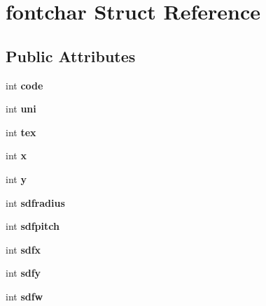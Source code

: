 \hypertarget{structfontchar}{}\section{fontchar Struct Reference}
\label{structfontchar}
\subsection*{Public Attributes}
\begin{DoxyCompactItemize}
\item 
\mbox{\label{structfontchar_a5b75429ff655bda1fae43bba91c30109}} 
int {\bfseries code}
\item 
\mbox{\label{structfontchar_a2c5a26a10fed40d19840cc2be99cb466}} 
int {\bfseries uni}
\item 
\mbox{\label{structfontchar_a61ac569a542afe35acaa01c76b6ed7e6}} 
int {\bfseries tex}
\item 
\mbox{\label{structfontchar_a0a8dcacee2bf0a1b8467f97c65e8b661}} 
int {\bfseries x}
\item 
\mbox{\label{structfontchar_a00b75e11ac16114f3c39985b85f1a532}} 
int {\bfseries y}
\item 
\mbox{\label{structfontchar_ac7943e75638557bde99d7ad099b70b1a}} 
int {\bfseries sdfradius}
\item 
\mbox{\label{structfontchar_aa05297ae69315d59535360f5715b417c}} 
int {\bfseries sdfpitch}
\item 
\mbox{\label{structfontchar_a02a7208625d7d22d423a2a7e014ea89d}} 
int {\bfseries sdfx}
\item 
\mbox{\label{structfontchar_a7543ff67135154fcafc2d7e54984791e}} 
int {\bfseries sdfy}
\item 
\mbox{\label{structfontchar_a2c7b533d098a3eb6955ee3d77235636d}} 
int {\bfseries sdfw}
\item 
\mbox{\label{structfontchar_aef2bbf1a28f329614a640fb013e2be68}} 

\end{DoxyCompactItemize}

